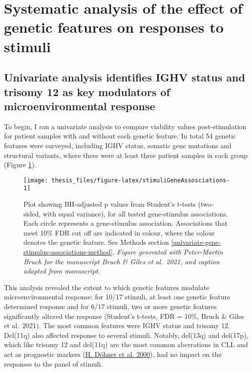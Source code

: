 \documentclass[11pt, a4paper, twosided]{book}
\begin{document}
\hypertarget{systematic-analysis-of-the-effect-of-genetic-features-on-responses-to-stimuli}{%
\section{Systematic analysis of the effect of genetic features on responses to stimuli}\label{systematic-analysis-of-the-effect-of-genetic-features-on-responses-to-stimuli}}

\hypertarget{univariate-gene-stimulus-assosciations}{%
\subsection{Univariate analysis identifies IGHV status and trisomy 12 as key modulators of microenvironmental response}\label{univariate-gene-stimulus-assosciations}}

To begin, I ran a univariate analysis to compare viability values post-stimulation for patient samples with and without each genetic feature. In total 54 genetic features were surveyed, including IGHV status, somatic gene mutations and structural variants, where there were at least three patient samples in each group (Figure \ref{fig:stimuliGeneAssosciations}).


\begin{figure}

{\centering \texttt{[image: thesis\_files/figure-latex/stimuliGeneAssosciations-1]} 

}

\caption{Plot showing BH-adjusted p values from Student's t-tests (two-sided, with equal variance), for all tested gene-stimulus associations. Each circle represents a gene-stimulus association. Associations that meet 10\% FDR cut off are indicated in colour, where the colour denotes the genetic feature. See Methods section \ref{univariate-gene-stimulus-associations-method}. \emph{Figure generated with Peter-Martin Bruch for the manuscript Bruch \& Giles et al.~2021, and caption adapted from manuscript.}}\label{fig:stimuliGeneAssosciations}
\end{figure}
This analysis revealed the extent to which genetic features modulate microenvironmental response: for 10/17 stimuli, at least one genetic feature determined response and for 6/17 stimuli, two or more genetic features significantly altered the response (Student's t-tests, FDR = 10\%, Bruch \& Giles et al.~2021). The most common features were IGHV status and trisomy 12. Del(11q) also affected response to several stimuli. Notably, del(13q) and del(17p), which like trisomy 12 and del(11q) are the most common aberrations in CLL and act as prognostic markers (\protect\hyperlink{ref-Dohner2000}{H. Döhner et al. 2000}), had no impact on the responses to the panel of stimuli.
\end{document}
